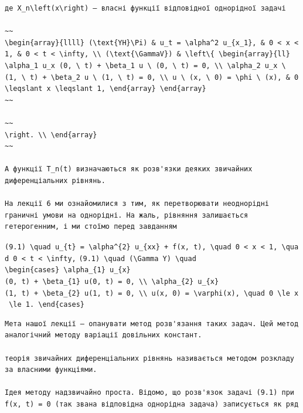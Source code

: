 \documentclass[
  ukrainian,
]{article}
\begin{document}
\begin{verbatim}
де X_n\left(x\right) — власні функції відповідної однорідної задачі

~~
\begin{array}{llll} (\text{YH}\Pi) & u_t = \alpha^2 u_{x_1}, & 0 < x < 1, & 0 < t < \infty, \\ (\text{\GammaV}) & \left\{ \begin{array}{ll} \alpha_1 u_x (0, \ t) + \beta_1 u \ (0, \ t) = 0, \\ \alpha_2 u_x \ (1, \ t) + \beta_2 u \ (1, \ t) = 0, \\ u \ (x, \ 0) = \phi \ (x), & 0 \leqslant x \leqslant 1, \end{array} \end{array}
~~

~~
\right. \\ \end{array}
~~

А функції T_n(t) визначаються як розв'язки деяких звичайних диференціальних рівнянь.

На лекції 6 ми ознайомилися з тим, як перетворювати неоднорідні граничні умови на однорідні. На жаль, рівняння залишається гетерогенним, і ми стоїмо перед завданням
\end{verbatim}

\texttt{(9.1)\ \textbackslash{}quad\ u\_\{t\}\ =\ \textbackslash{}alpha\^{}\{2\}\ u\_\{xx\}\ +\ f(x,\ t),\ \textbackslash{}quad\ 0\ \textless{}\ x\ \textless{}\ 1,\ \textbackslash{}quad\ 0\ \textless{}\ t\ \textless{}\ \textbackslash{}infty,}
\texttt{(9.1)\ \textbackslash{}quad\ (\textbackslash{}Gamma\ Y)\ \textbackslash{}quad}
\texttt{\textbackslash{}begin\{cases\}\ \textbackslash{}alpha\_\{1\}\ u\_\{x\}(0,\ t)\ +\ \textbackslash{}beta\_\{1\}\ u(0,\ t)\ =\ 0,\ \textbackslash{}\textbackslash{}\ \textbackslash{}alpha\_\{2\}\ u\_\{x\}(1,\ t)\ +\ \textbackslash{}beta\_\{2\}\ u(1,\ t)\ =\ 0,\ \textbackslash{}\textbackslash{}\ u(x,\ 0)\ =\ \textbackslash{}varphi(x),\ \textbackslash{}quad\ 0\ \textbackslash{}le\ x\ \textbackslash{}le\ 1.\ \textbackslash{}end\{cases\}}

\begin{verbatim}
Мета нашої лекції — опанувати метод розв'язання таких задач. Цей метод аналогічний методу варіації довільних констант.

теорія звичайних диференціальних рівнянь називається методом розкладу за власними функціями.

Ідея методу надзвичайно проста. Відомо, що розв'язок задачі (9.1) при f(x, t) = 0 (так звана відповідна однорідна задача) записується як ряд
\end{verbatim}
\end{document}
